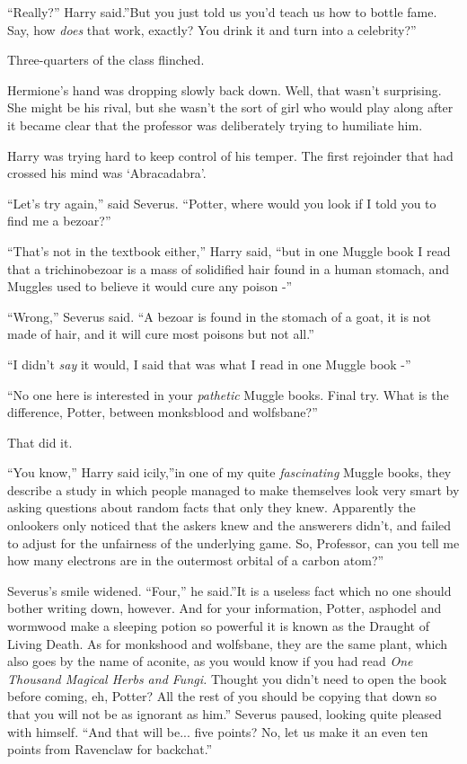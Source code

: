 ``Really?'' Harry said.''But you just told us you'd teach us how to
bottle fame. Say, how \emph{does} that work, exactly? You drink it and
turn into a celebrity?''

Three-quarters of the class flinched.

Hermione's hand was dropping slowly back down. Well, that wasn't
surprising. She might be his rival, but she wasn't the sort of girl who
would play along after it became clear that the professor was
deliberately trying to humiliate him.

Harry was trying hard to keep control of his temper. The first rejoinder
that had crossed his mind was `Abracadabra'.

``Let's try again,'' said Severus. ``Potter, where would you look if I
told you to find me a bezoar?''

``That's not in the textbook either,'' Harry said, ``but in one Muggle
book I read that a trichinobezoar is a mass of solidified hair found in
a human stomach, and Muggles used to believe it would cure any poison
-''

``Wrong,'' Severus said. ``A bezoar is found in the stomach of a goat,
it is not made of hair, and it will cure most poisons but not all.''

``I didn't \emph{say} it would, I said that was what I read in one Muggle
book -''

``No one here is interested in your \emph{pathetic} Muggle books. Final
try. What is the difference, Potter, between monksblood and wolfsbane?''

That did it.

``You know,'' Harry said icily,''in one of my quite \emph{fascinating}
Muggle books, they describe a study in which people managed to make
themselves look very smart by asking questions about random facts that
only they knew. Apparently the onlookers only noticed that the askers
knew and the answerers didn't, and failed to adjust for the unfairness
of the underlying game. So, Professor, can you tell me how many
electrons are in the outermost orbital of a carbon atom?''

Severus's smile widened. ``Four,'' he said.''It is a useless fact which
no one should bother writing down, however. And for your information,
Potter, asphodel and wormwood make a sleeping potion so powerful it is
known as the Draught of Living Death. As for monkshood and wolfsbane,
they are the same plant, which also goes by the name of aconite, as you
would know if you had read \emph{One Thousand Magical Herbs and Fungi.}
Thought you didn't need to open the book before coming, eh, Potter? All
the rest of you should be copying that down so that you will not be as
ignorant as him.'' Severus paused, looking quite pleased with himself.
``And that will be... five points? No, let us make it an even ten
points from Ravenclaw for backchat.''

